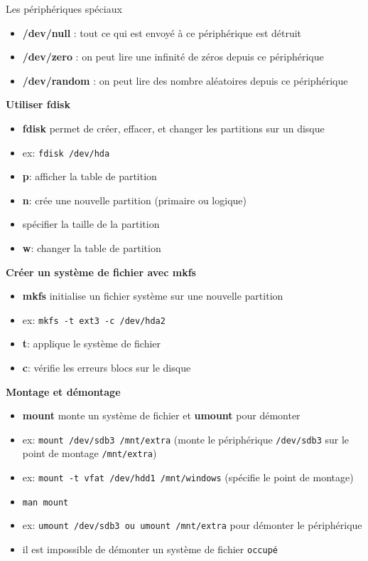 \documentclass[french]{beamer}
\begin{document}
\begin{frame}
Les périphériques spéciaux
	\begin{itemize}
	\item \textbf{/dev/null} : tout ce qui est envoyé à ce périphérique est détruit
	\item \textbf{/dev/zero} : on peut lire une infinité de zéros depuis ce périphérique
	\item \textbf{/dev/random} : on peut lire des nombre aléatoires depuis ce périphérique
	\end{itemize}
\end{frame}




\begin{frame}
\textbf{Utiliser fdisk}
\begin{itemize}
\item \textbf{fdisk} permet de créer, effacer, et changer les partitions sur
un disque
\item ex: \texttt{fdisk /dev/hda}
\item \textbf{p}: afficher la table de partition
\item \textbf{n}: crée une nouvelle partition (primaire ou logique)
\item spécifier la taille de la partition
\item \textbf{w}: changer la table de partition
\end{itemize}
\end{frame}

\begin{frame}
\textbf{Créer un système de fichier avec mkfs}
\begin{itemize}
\item \textbf{mkfs} initialise un fichier système sur une nouvelle partition
\item ex: \texttt{mkfs -t ext3 -c /dev/hda2}
\item \textbf{t}: applique le système de fichier
\item \textbf{c}: vérifie les erreurs blocs sur le disque
\end{itemize}
\end{frame}

\begin{frame}
\textbf{Montage et démontage}
\begin{itemize}
\item \textbf{mount} monte un système de fichier et \textbf{umount} pour démonter
\item ex: \texttt{mount /dev/sdb3 /mnt/extra} (monte le périphérique
\texttt{/dev/sdb3} sur le point de montage \texttt{/mnt/extra})
\item ex: \texttt{mount -t vfat /dev/hdd1 /mnt/windows} (spécifie le point de
montage)
\item \texttt{man mount}
\item ex: \texttt{umount /dev/sdb3 ou umount /mnt/extra} pour démonter le périphérique
\item il est impossible de démonter un système de fichier \texttt{occupé}
\end{itemize}
\end{frame}
\end{document}
